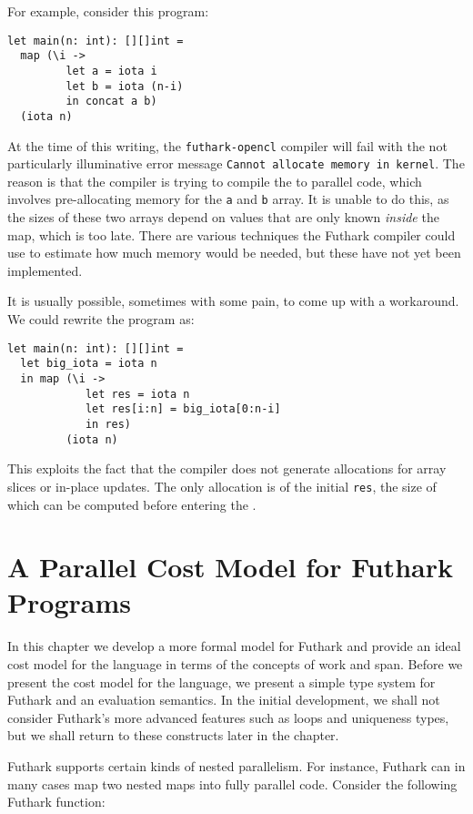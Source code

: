 \documentclass[oneside,11pt]{book}
\begin{document}
For example, consider this program:

\begin{lstlisting}
let main(n: int): [][]int =
  map (\i ->
         let a = iota i
         let b = iota (n-i)
         in concat a b)
  (iota n)
\end{lstlisting}

At the time of this writing, the \texttt{futhark-opencl} compiler will
fail with the not particularly illuminative error message
\texttt{Cannot allocate memory in kernel}.  The reason is that the
compiler is trying to compile the  to parallel code, which
involves pre-allocating memory for the \texttt{a} and \texttt{b}
array.  It is unable to do this, as the sizes of these two arrays
depend on values that are only known \textit{inside} the map, which is
too late.  There are various techniques the Futhark compiler could use
to estimate how much memory would be needed, but these have not yet
been implemented.

It is usually possible, sometimes with some pain, to come up with a
workaround.  We could rewrite the program as:

\begin{lstlisting}
let main(n: int): [][]int =
  let big_iota = iota n
  in map (\i ->
            let res = iota n
            let res[i:n] = big_iota[0:n-i]
            in res)
         (iota n)
\end{lstlisting}

This exploits the fact that the compiler does not generate allocations
for array slices or in-place updates.  The only allocation is of the
initial \texttt{res}, the size of which can be computed before
entering the .

\chapter{A Parallel Cost Model for Futhark Programs}
\label{chap:costmodel}
In this chapter we develop a more formal model for Futhark and provide
an ideal cost model for the language in terms of the concepts of work
and span. Before we present the cost model for the language, we
present a simple type system for Futhark and an evaluation
semantics. In the initial development, we shall not consider Futhark's
more advanced features such as loops and uniqueness types, but we
shall return to these constructs later in the chapter.

Futhark supports certain kinds of nested parallelism. For instance,
Futhark can in many cases map two nested maps into fully parallel
code. Consider the following Futhark function:
\end{document}
